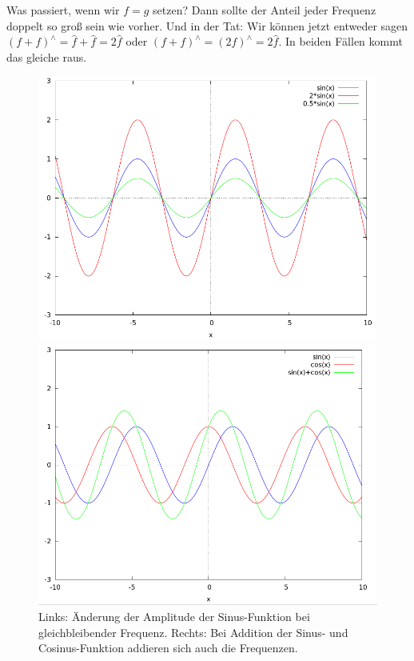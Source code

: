 \begin{remark}
\begin{description}
    Was passiert, wenn wir $ f = g $ setzen? Dann sollte der Anteil jeder Frequenz doppelt so groß
    sein wie vorher. Und in der Tat: Wir können jetzt entweder sagen 
    $ (f + f)^{\wedge} = \widehat{f} + \widehat{f} = 2 \widehat{f} $ oder
    $ (f + f)^{\wedge} = (2f)^{\wedge} = 2 \widehat{f} $. In beiden Fällen kommt das gleiche raus.
    \begin{figure}[ht]
      \centering
      \begin{minipage}{0.49\linewidth}
        \centering
        \includegraphics[width=\linewidth]{Bilder/FT_Linear1}
      \end{minipage}
      \begin{minipage}{0.49\linewidth}
        \centering
        \includegraphics[width=\linewidth]{Bilder/FT_Linear2}
      \end{minipage}
      \caption{Links: Änderung der Amplitude der Sinus-Funktion bei gleichbleibender Frequenz.
        Rechts: Bei Addition der Sinus- und Cosinus-Funktion addieren sich auch die Frequenzen.}
      \label{fig:FT_Linear}
    \end{figure}
    

\end{description}
\end{remark}
